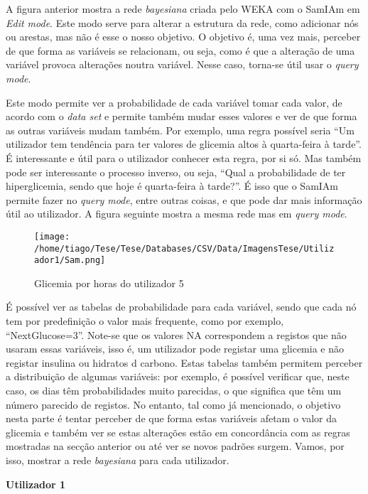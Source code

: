 A figura anterior mostra a rede \textit{bayesiana} criada pelo WEKA com o SamIAm em \textit{Edit mode}. Este modo serve para alterar a estrutura da rede, como adicionar nós ou arestas, mas não é esse o nosso objetivo. O objetivo é, uma vez mais, perceber de que forma as variáveis se relacionam, ou seja, como é que a alteração de uma variável provoca alterações noutra variável. Nesse caso, torna-se útil usar o \textit{query mode}. 

Este modo permite ver a probabilidade de cada variável tomar cada valor, de acordo com o \textit{data set} e permite também mudar esses valores e ver de que forma as outras variáveis mudam também. Por exemplo, uma regra possível seria ``Um utilizador tem tendência para ter valores de glicemia altos à quarta-feira à tarde''. É interessante e útil para o utilizador conhecer esta regra, por si só. Mas também pode ser interessante o processo inverso, ou seja, ``Qual a probabilidade de ter hiperglicemia, sendo que hoje é quarta-feira à tarde?''. É isso que o SamIAm permite fazer no \textit{query mode}, entre outras coisas, e que pode dar mais informação útil ao utilizador. A figura seguinte mostra a mesma rede mas em \textit{query mode}.

\begin{figure}[H]
\centering
\texttt{[image: /home/tiago/Tese/Tese/Databases/CSV/Data/ImagensTese/Utilizador1/Sam.png]}
\caption{Glicemia por horas do utilizador 5}
\end{figure}

É possível ver as tabelas de probabilidade para cada variável, sendo que cada nó tem por predefinição o valor mais frequente, como por exemplo, ``Next\textunderscore Glucose=3''. Note-se que os valores NA correspondem a registos que não usaram essas variáveis, isso é, um utilizador pode registar uma glicemia e não registar insulina ou hidratos d carbono. Estas tabelas também permitem perceber a distribuição de algumas variáveis: por exemplo, é possível verificar que, neste caso, os dias têm probabilidades muito parecidas, o que significa que têm um número parecido de registos. No entanto, tal como já mencionado, o objetivo nesta parte é tentar perceber de que forma estas variáveis afetam o valor da glicemia e também ver se estas alterações estão em concordância com as regras mostradas na secção anterior ou até ver se novos padrões surgem. Vamos, por isso, mostrar a rede \textit{bayesiana} para cada utilizador. 

\textbf{Utilizador 1}

